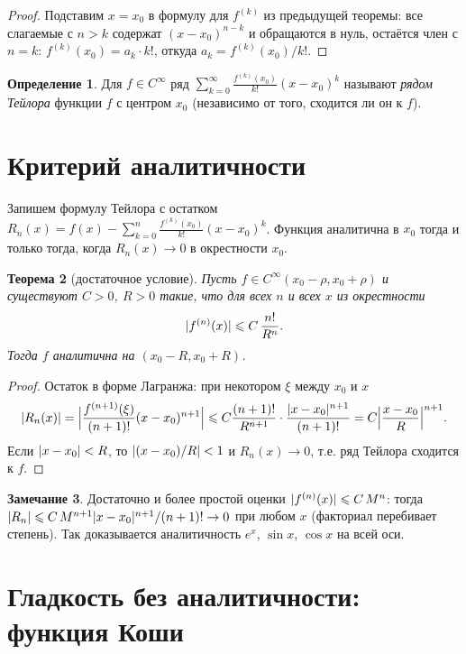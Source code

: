 \documentclass[11pt,a4paper]{article}
\theoremstyle{definition}
\newtheorem{definition}{Определение}[section]
\newtheorem{remark}[definition]{Замечание}
\theoremstyle{plain}
\newtheorem{theorem}[definition]{Теорема}
\renewcommand{\le}{\leqslant}
\DeclarePairedDelimiter{\abs}{\lvert}{\rvert}
\begin{document}
\begin{proof}
Подставим $x=x_0$ в формулу для $f^{(k)}$ из предыдущей теоремы: все слагаемые с $n>k$ содержат
$(x-x_0)^{n-k}$ и обращаются в нуль, остаётся член с $n=k$:
$f^{(k)}(x_0)=a_k\cdot k!$, откуда $a_k=f^{(k)}(x_0)/k!$.
\end{proof}

\begin{definition}
Для $f\in C^\infty$ ряд $\displaystyle\sum_{k=0}^\infty\frac{f^{(k)}(x_0)}{k!}(x-x_0)^k$ называют
\emph{рядом Тейлора} функции $f$ с центром $x_0$ (независимо от того, сходится ли он к $f$).
\end{definition}

\section{Критерий аналитичности}

Запишем формулу Тейлора с остатком $R_n(x)=f(x)-\sum_{k=0}^n\frac{f^{(k)}(x_0)}{k!}(x-x_0)^k$.
Функция аналитична в $x_0$ тогда и только тогда, когда $R_n(x)\to0$ в окрестности $x_0$.

\begin{theorem}[достаточное условие]
Пусть $f\in C^\infty(x_0-\rho,x_0+\rho)$ и существуют $C>0$, $R>0$ такие, что для всех $n$ и всех
$x$ из окрестности
\[
  \abs{f^{(n)}(x)}\le C\,\frac{n!}{R^n}.
\]
Тогда $f$ аналитична на $(x_0-R,x_0+R)$.
\end{theorem}

\begin{proof}
Остаток в форме Лагранжа: при некотором $\xi$ между $x_0$ и $x$
\[
  \abs{R_n(x)}=\abs[\Big]{\frac{f^{(n+1)}(\xi)}{(n+1)!}(x-x_0)^{n+1}}
   \le C\frac{(n+1)!}{R^{n+1}}\cdot\frac{\abs{x-x_0}^{n+1}}{(n+1)!}
   =C\abs[\Big]{\frac{x-x_0}{R}}^{n+1}.
\]
Если $\abs{x-x_0}<R$, то $\abs{(x-x_0)/R}<1$ и $R_n(x)\to0$, т.е. ряд Тейлора сходится к $f$.
\end{proof}

\begin{remark}
Достаточно и более простой оценки $\abs{f^{(n)}(x)}\le C\,M^{n}$: тогда
$\abs{R_n}\le C\,M^{n+1}\abs{x-x_0}^{n+1}/(n+1)!\to0$ при любом $x$ (факториал перебивает
степень). Так доказывается аналитичность $e^x$, $\sin x$, $\cos x$ на всей оси.
\end{remark}

\section{Гладкость без аналитичности: функция Коши}
\end{document}

